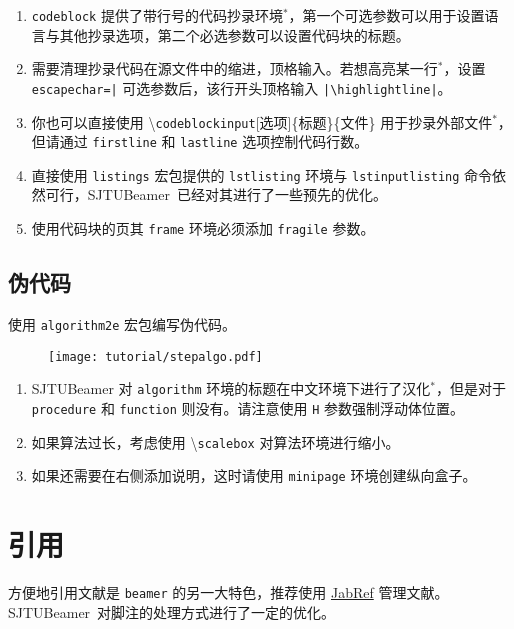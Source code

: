 \documentclass[
    UTF8,
    heading=true,
    12pt,
    a4paper
]{ctexrep}
\newenvironment{commentlist}{\begin{enumerate}\small}{\end{enumerate}}
\newcommand{\cmd}[1]{\textbackslash{}\texttt{#1}}
\newcommand{\env}[1]{\texttt{#1}}
\newcommand{\pkg}[1]{\texttt{#1}}
\def\themename{\textsf{SJTUBeamer}}
\begin{document}
\begin{commentlist}
  \item \texttt{codeblock} 提供了带行号的代码抄录环境$^*$，第一个可选参数可以用于设置语言与其他抄录选项，第二个必选参数可以设置代码块的标题。
  \item 需要清理抄录代码在源文件中的缩进，顶格输入。若想高亮某一行$^*$，设置 \verb"escapechar=|" 可选参数后，该行开头顶格输入 \verb"|\highlightline|"。
  \item 你也可以直接使用 \cmd{codeblockinput}[选项]\{标题\}\{文件\} 用于抄录外部文件$^*$，但请通过 \verb"firstline" 和 \verb"lastline" 选项控制代码行数。
  \item 直接使用 \texttt{listings} 宏包提供的 \texttt{lstlisting} 环境与 \texttt{lstinputlisting} 命令依然可行，\themename\ 已经对其进行了一些预先的优化。
  \item[\faExclamationTriangle] 使用代码块的页其 \texttt{frame} 环境必须添加 \texttt{fragile} 参数。
\end{commentlist}

\section{伪代码}

使用 \pkg{algorithm2e} 宏包编写伪代码。

\begin{figure}[h]
  \centering
  \texttt{[image: tutorial/stepalgo.pdf]}
\end{figure}


\begin{commentlist}
  \item \themename{} 对 \env{algorithm} 环境的标题在中文环境下进行了汉化$^*$，但是对于 \env{procedure} 和 \env{function} 则没有。请注意使用 \texttt{H} 参数强制浮动体位置。
  \item 如果算法过长，考虑使用 \cmd{scalebox} 对算法环境进行缩小。
  \item 如果还需要在右侧添加说明，这时请使用 \env{minipage} 环境创建纵向盒子。
\end{commentlist}


\chapter{引用}

方便地引用文献是 \texttt{beamer} 的另一大特色，推荐使用 \href{https://www.jabref.org/}{JabRef} 管理文献。\themename\ 对脚注的处理方式进行了一定的优化。
\end{document}
